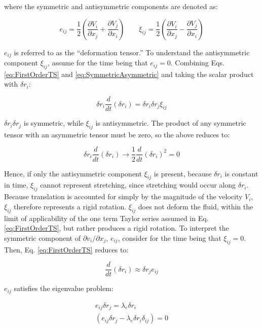 \documentclass[10pt]{article}
\numberwithin{equation}{section} %
\begin{document}
where the symmetric and antisymmetric components are denoted as:

\begin{equation}
\label{eq:SymmetricAsymmetric}
e_{ij}=\frac{1}{2}\left(\frac{\partial V_i}{\partial x_j}+\frac{\partial V_j}{\partial x_i}\right)\quad\quad\xi_{ij}=\frac{1}{2}\left(\frac{\partial V_i}{\partial x_j}-\frac{\partial V_j}{\partial x_i}\right)
\end{equation}

\(e_{ij}\) is referred to as the ``deformation tensor.'' To understand the antisymmetric component \(\xi_{ij}\), assume for the time being that \(e_{ij}=0\). Combining Eqs. \eqref{eq:FirstOrderTS} and \eqref{eq:SymmetricAsymmetric} and taking the scalar product with \(\delta r_i\):

\begin{equation}
\delta r_i\frac{d}{dt}(\delta r_i)=\delta r_i\delta r_j\xi_{ij}
\end{equation}

\(\delta r_i\delta r_j\) is symmetric, while \(\xi_{ij}\) is antisymmetric. The product of any symmetric tensor with an asymmetric tensor must be zero, so the above reduces to:

\begin{equation}
\delta r_i\frac{d}{dt}(\delta r_i)\rightarrow\frac{1}{2}\frac{d}{dt}\left(\delta r_i\right)^2=0
\end{equation}

Hence, if only the antisymmetric component \(\xi_{ij}\) is present, because \(\delta r_i\) is constant in time, \(\xi_{ij}\) cannot represent stretching, since stretching would occur along \(\delta r_i\). Because translation is accounted for simply by the magnitude of the velocity \(V_i\), \(\xi_{ij}\) therefore represents a rigid rotation. \(\xi_{ij}\) does not deform the fluid, within the limit of applicability of the one term Taylor series assumed in Eq. \eqref{eq:FirstOrderTS}, but rather produces a rigid rotation. To interpret the symmetric component of \(\partial v_i/\partial x_j\), \(e_{ij}\), consider for the time being that \(\xi_{ij}=0\). Then, Eq. \eqref{eq:FirstOrderTS} reduces to:

\begin{equation}
\label{eq:Eigenvalue}
\frac{d}{dt}(\delta r_i)\approx\delta r_je_{ij}
\end{equation}

\(e_{ij}\) satisfies the eigenvalue problem:

\begin{equation}
\label{eq:Eigenvalue2}
\begin{aligned}
e_{ij}\delta r_j=\lambda_e \delta r_i\\
\left(e_{ij}\delta r_j-\lambda_e\delta r_i\delta_{ij}\right)=0\\
\end{aligned}
\end{equation}
\end{document}
